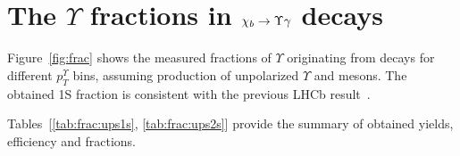 \section{The \texorpdfstring{$\Upsilon$}{Y} fractions in \texorpdfstring{$\chi_{b} \rightarrow \Upsilon \gamma$}{chib --> Y gamma} decays}
\label{sec:mc}

Figure~\ref{fig:frac} shows the measured fractions of $\Upsilon$ originating
from \chib decays for different $p_T^{\Upsilon}$ bins,  assuming production of
unpolarized $\Upsilon$ and \chib mesons. The obtained \Y1S fraction is
consistent with the previous LHCb result~\cite{LHCb-PAPER-2012-015}.



Tables~[\ref{tab:frac:ups1s}, \ref{tab:frac:ups2s}] provide the summary
of obtained yields, efficiency and fractions.


